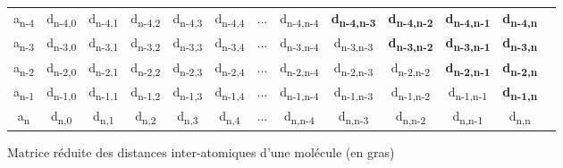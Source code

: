 \begin{figure}[h!]
\begin{tabular}{c|c|c|c|c|c|c|c|c|c|c|c|c}
		\rot{... } & \rot{... } & \rot{... } & \rot{... } & \rot{... } & 
		\rot{... } & \halfrot{ ... } & \rot{... } & \rot{... } & \rot{... } & 
		\rot{... } & \rot{... } \\ \hline
	    	
	    	
		a\textsubscript{n-4} & d\textsubscript{n-4,0} & d\textsubscript{n-4,1} & d\textsubscript{n-4,2} & 
			d\textsubscript{n-4,3} & d\textsubscript{n-4,4} & ... & d\textsubscript{n-4,n-4} & 
			\textbf{d\textsubscript{n-4,n-3}} & \textbf{d\textsubscript{n-4,n-2}} & \textbf{d\textsubscript{n-4,n-1}} & 
			\textbf{d\textsubscript{n-4,n}} \\ \hline	    
		a\textsubscript{n-3} & d\textsubscript{n-3,0} & d\textsubscript{n-3,1} & d\textsubscript{n-3,2} & 
			d\textsubscript{n-3,3} & d\textsubscript{n-3,4} & ... & d\textsubscript{n-3,n-4} & 
			d\textsubscript{n-3,n-3} & \textbf{d\textsubscript{n-3,n-2}} & \textbf{d\textsubscript{n-3,n-1}} & 
			\textbf{d\textsubscript{n-3,n}} \\ \hline
		a\textsubscript{n-2} & d\textsubscript{n-2,0} & d\textsubscript{n-2,1} & d\textsubscript{n-2,2} & 
			d\textsubscript{n-2,3} & d\textsubscript{n-2,4} & ... & d\textsubscript{n-2,n-4} & 
			d\textsubscript{n-2,n-3} & d\textsubscript{n-2,n-2} & \textbf{d\textsubscript{n-2,n-1}} & 
			\textbf{d\textsubscript{n-2,n}} \\ \hline
		a\textsubscript{n-1} & d\textsubscript{n-1,0} & d\textsubscript{n-1,1} & d\textsubscript{n-1,2} & 
			d\textsubscript{n-1,3} & d\textsubscript{n-1,4} & ... & d\textsubscript{n-1,n-4} & 
			d\textsubscript{n-1,n-3} & d\textsubscript{n-1,n-2} & d\textsubscript{n-1,n-1} & 
			\textbf{d\textsubscript{n-1,n}} \\ \hline
		a\textsubscript{n} & d\textsubscript{n,0} & d\textsubscript{n,1} & d\textsubscript{n,2} & 
			d\textsubscript{n,3} & d\textsubscript{n,4} & ... & d\textsubscript{n,n-4} & 
			d\textsubscript{n,n-3} & d\textsubscript{n,n-2} & d\textsubscript{n,n-1} & d\textsubscript{n,n} \\ \hline
		
	\end{tabular}

	
	\caption{Matrice réduite des distances inter-atomiques d'une molécule (en gras)}
\end{figure}

